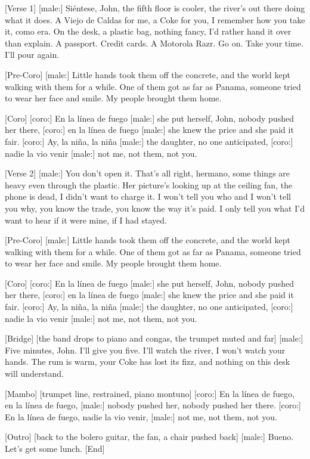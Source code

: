 \begin{lyrics}

[Verse 1]
[male:]
Siéntese, John, the fifth floor is cooler,
the river's out there doing what it does.
A Viejo de Caldas for me, a Coke for you,
I remember how you take it, como era.
On the desk, a plastic bag, nothing fancy,
I'd rather hand it over than explain.
A passport. Credit cards. A Motorola Razr.
Go on. Take your time. I'll pour again.

[Pre-Coro]
[male:]
Little hands took them off the concrete,
and the world kept walking with them for a while.
One of them got as far as Panama,
someone tried to wear her face and smile.
My people brought them home.

[Coro]
[coro:]
En la línea de fuego
[male:]
she put herself, John, nobody pushed her there,
[coro:]
en la línea de fuego
[male:]
she knew the price and she paid it fair.
[coro:]
Ay, la niña, la niña
[male:]
the daughter, no one anticipated,
[coro:]
nadie la vio venir
[male:]
not me, not them, not you.

[Verse 2]
[male:]
You don't open it. That's all right, hermano,
some things are heavy even through the plastic.
Her picture's looking up at the ceiling fan,
the phone is dead, I didn't want to charge it.
I won't tell you who and I won't tell you why,
you know the trade, you know the way it's paid.
I only tell you what I'd want to hear
if it were mine, if I had stayed.

[Pre-Coro]
[male:]
Little hands took them off the concrete,
and the world kept walking with them for a while.
One of them got as far as Panama,
someone tried to wear her face and smile.
My people brought them home.

[Coro]
[coro:]
En la línea de fuego
[male:]
she put herself, John, nobody pushed her there,
[coro:]
en la línea de fuego
[male:]
she knew the price and she paid it fair.
[coro:]
Ay, la niña, la niña
[male:]
the daughter, no one anticipated,
[coro:]
nadie la vio venir
[male:]
not me, not them, not you.

[Bridge]
[the band drops to piano and congas, the trumpet muted and far]
[male:]
Five minutes, John. I'll give you five.
I'll watch the river, I won't watch your hands.
The rum is warm, your Coke has lost its fizz,
and nothing on this desk will understand.

[Mambo]
[trumpet line, restrained, piano montuno]
[coro:]
En la línea de fuego, en la línea de fuego,
[male:]
nobody pushed her, nobody pushed her there.
[coro:]
En la línea de fuego, nadie la vio venir,
[male:]
not me, not them, not you.

[Outro]
[back to the bolero guitar, the fan, a chair pushed back]
[male:]
Bueno.
Let's get some lunch.
[End]
\end{lyrics}

